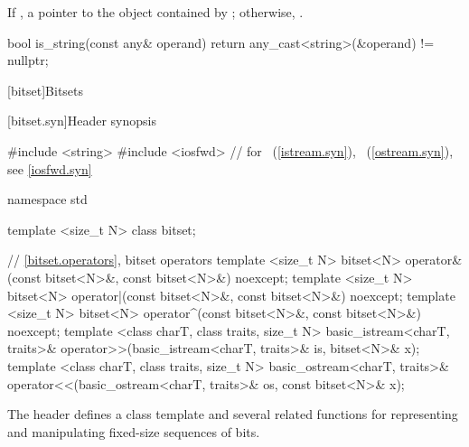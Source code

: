 \begin{itemdescr}
\pnum
\returns
If ,
a pointer to the object contained by ;
otherwise, .

\pnum
\begin{example}
\begin{codeblock}
bool is_string(const any& operand) {
  return any_cast<string>(&operand) != nullptr;
}
\end{codeblock}
\end{example}
\end{itemdescr}

[bitset]{Bitsets}
%

[bitset.syn]{Header  synopsis}%

%
%

\begin{codeblock}
#include <string>
#include <iosfwd>   // for ~(\ref{istream.syn}), ~(\ref{ostream.syn}), see \ref{iosfwd.syn}

namespace std {
  template <size_t N> class bitset;

  // \ref{bitset.operators}, bitset operators
  template <size_t N>
    bitset<N> operator&(const bitset<N>&, const bitset<N>&) noexcept;
  template <size_t N>
    bitset<N> operator|(const bitset<N>&, const bitset<N>&) noexcept;
  template <size_t N>
    bitset<N> operator^(const bitset<N>&, const bitset<N>&) noexcept;
  template <class charT, class traits, size_t N>
    basic_istream<charT, traits>&
      operator>>(basic_istream<charT, traits>& is, bitset<N>& x);
  template <class charT, class traits, size_t N>
    basic_ostream<charT, traits>&
      operator<<(basic_ostream<charT, traits>& os, const bitset<N>& x);
}
\end{codeblock}

\pnum
The header
defines a
class template
and several related functions for representing
and manipulating fixed-size sequences of bits.

